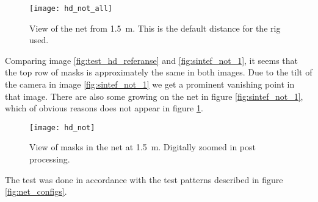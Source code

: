 \begin{figure}[htbp]
	\centering
	\texttt{[image: hd\_not\_all]}
	\caption{View of the net from \SI{1.5}{\metre}. This is the default distance for the rig used.}
	\label{fig:test_hd_referanse}
\end{figure}

Comparing image \vref{fig:test_hd_referanse} and \vref{fig:sintef_not_1}, it seems that the 
top row of masks is approximately the same in both images. Due to the tilt of the 
camera in image \ref{fig:sintef_not_1} we get a prominent vanishing point in that image. There 
are also some growing on the net in figure \ref{fig:sintef_not_1}, which of obvious reasons does not appear 
in figure \ref{fig:test_hd_referanse}.

\begin{figure}[htbp]
	\centering
	\texttt{[image: hd\_not]}
	\caption{View of masks in the net at \SI{1.5}{\metre}. Digitally zoomed in post processing.}
	\label{fig:test_hd_clip}
\end{figure}

The test was done in accordance with the test patterns described in figure \vref{fig:net_configs}. 